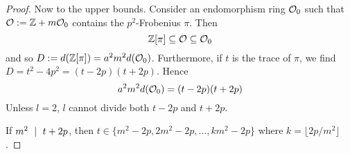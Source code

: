 \begin{proof}
    Now to the upper bounds.
    Consider an endomorphism ring $\mathcal{O}_0$ such that $\mathcal{O} := \mathbb{Z} + m\mathcal{O}_0$ contains the $p^2$-Frobenius $\pi$.
    Then
    \begin{equation*}
        \mathbb{Z}[\pi] \subseteq \mathcal{O} \subseteq \mathcal{O}_0
    \end{equation*}
    and so $D := d(\mathbb{Z}[\pi]) = a^2m^2d(\mathcal{O}_0)$.
    Furthermore, if $t$ is the trace of $\pi$, we find $D = t^2 - 4p^2 = (t - 2p)(t + 2p)$.
    Hence
    \begin{equation*}
        a^2m^2d(\mathcal{O}_0) = (t - 2p)(t + 2p)
    \end{equation*}
    Unless $l = 2$, $l$ cannot divide both $t - 2p$ and $t + 2p$.

    If $m^2 \ \mid \  t + 2p$, then $t \in \{ m^2 - 2p, 2m^2 - 2p, ..., km^2 - 2p \}$ where $k = \lfloor 2p/m^2 \rfloor$.


\end{proof}
